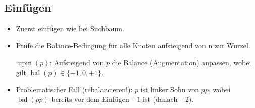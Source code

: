 \begin{sectionbox}
\end{sectionbox}

\begin{sectionbox}
\subsection{Einfügen}\smallskip
\begin{itemize}
    \item Zuerst einfügen wie bei Suchbaum.
    \item Prüfe die Balance-Bedingung für alle Knoten aufsteigend von n zur Wurzel.
    \par \textbf{$\operatorname{upin}(p)$}: Aufsteigend von $p$ die Balance (Augmentation) anpassen, wobei gilt $\operatorname{bal}(p) \in \{-1,0,+1\}$.
    \item Problematischer Fall (rebalancieren!): $p$ ist linker Sohn von $pp$, wobei $\operatorname{bal}(pp)$ bereits vor dem Einfügen $-1$ ist (danach $-2$).
\end{itemize}\par\smallskip
\end{sectionbox}

